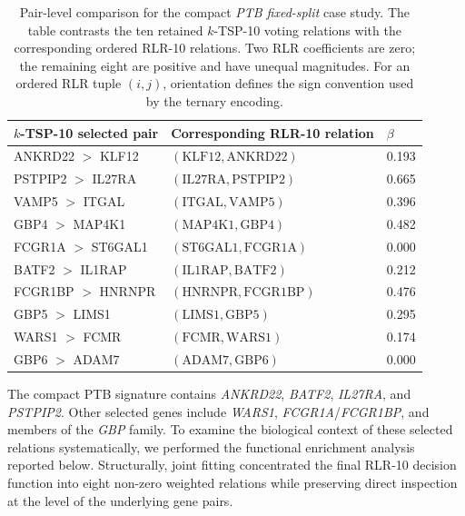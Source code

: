 \documentclass[11pt, a4paper]{article}
\newcommand{\stdtablefont}{\small}
\newcommand{\stdtablelayout}{%
  \stdtablefont
  \setlength{\tabcolsep}{4pt}
  \renewcommand{\arraystretch}{1.2}
}
\begin{document}
\begin{table}[!htbp]
\centering
\caption{Pair-level comparison for the compact \emph{PTB fixed-split} case study. The table contrasts the ten retained $k$-TSP-10 voting relations with the corresponding ordered RLR-10 relations. Two RLR coefficients are zero; the remaining eight are positive and have unequal magnitudes. For an ordered RLR tuple $(i,j)$, orientation defines the sign convention used by the ternary encoding.}
\label{tab:ptb_compact_pairs}
{\stdtablelayout
\begin{adjustbox}{max width=\linewidth}
\begin{tabular}{L{0.38\textwidth}L{0.30\textwidth}C{0.14\textwidth}}
\toprule
\textbf{$k$-TSP-10 selected pair} &
\textbf{Corresponding RLR-10 relation} &
\textbf{$\beta$} \\
\midrule
ANKRD22 $>$ KLF12   & $(\mathrm{KLF12},\mathrm{ANKRD22})$   & 0.193 \\
PSTPIP2 $>$ IL27RA  & $(\mathrm{IL27RA},\mathrm{PSTPIP2})$  & 0.665 \\
VAMP5 $>$ ITGAL     & $(\mathrm{ITGAL},\mathrm{VAMP5})$     & 0.396 \\
GBP4 $>$ MAP4K1     & $(\mathrm{MAP4K1},\mathrm{GBP4})$     & 0.482 \\
FCGR1A $>$ ST6GAL1  & $(\mathrm{ST6GAL1},\mathrm{FCGR1A})$  & 0.000 \\
BATF2 $>$ IL1RAP    & $(\mathrm{IL1RAP},\mathrm{BATF2})$    & 0.212 \\
FCGR1BP $>$ HNRNPR  & $(\mathrm{HNRNPR},\mathrm{FCGR1BP})$  & 0.476 \\
GBP5 $>$ LIMS1      & $(\mathrm{LIMS1},\mathrm{GBP5})$      & 0.295 \\
WARS1 $>$ FCMR      & $(\mathrm{FCMR},\mathrm{WARS1})$      & 0.174 \\
GBP6 $>$ ADAM7      & $(\mathrm{ADAM7},\mathrm{GBP6})$      & 0.000 \\
\bottomrule
\end{tabular}
\end{adjustbox}
}
\end{table}

The compact PTB signature contains \emph{ANKRD22}, \emph{BATF2}, \emph{IL27RA}, and \emph{PSTPIP2}. Other selected genes include \emph{WARS1}, \emph{FCGR1A}/\emph{FCGR1BP}, and members of the \emph{GBP} family. To examine the biological context of these selected relations systematically, we performed the functional enrichment analysis reported below. Structurally, joint fitting concentrated the final RLR-10 decision function into eight non-zero weighted relations while preserving direct inspection at the level of the underlying gene pairs.
\end{document}
